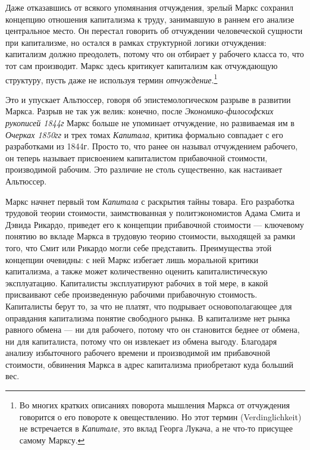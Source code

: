 \documentclass[12pt]{book}
\begin{document}
Даже отказавшись от всякого упомянания отчуждения, зрелый Маркс сохранил концепцию отношения капитализма к труду, занимавшую в раннем его анализе центральное место. Он перестал говорить об отчуждении человеческой сущности при капитализме, но остался в рамках структурной логики отчуждения: капитализм должно преодолеть, потому что он отбирает у рабочего класса то, что тот сам производит. Маркс здесь критикует капитализм как отчуждающую структуру, пусть даже не используя термин \textit{отчуждение}.\footnote{Во многих кратких описаниях поворота мышления Маркса от отчуждения говорится о его повороте к овеществлению. Но этот термин (Verdinglichkeit) не встречается в \textit{Капитале}, это вклад Георга Лукача, а не что-то присущее самому Марксу.}

Это и упускает Альтюссер, говоря об эпистемологическом разрыве в развитии Маркса. Разрыв не так уж велик: конечно, после \textit{Экономико-философских рукописей 1844г} Маркс больше не упоминает отчуждение, но развиваемая им в \textit{Очерках 1850гг} и трех томах \textit{Капитала}, критика формально совпадает с его разработками из 1844г. Просто то, что ранее он называл отчуждением рабочего, он теперь называет присвоением капиталистом прибавочной стоимости, производимой рабочим. Это различие не столь существенно, как настаивает Альтюссер.

Маркс начнет первый том \textit{Капитала} с раскрытия тайны товара. Его разработка трудовой теории стоимости, заимствованная у политэкономистов Адама Смита и Дэвида Рикардо, приведет его к концепции прибавочной стоимости --- ключевому понятию во вкладе Маркса в трудовую теорию стоимости, выходящей за рамки того, что Смит или Рикардо могли себе представить. Преимущества этой концепции очевидны: с ней Маркс избегает лишь моральной критики капитализма, а также может количественно оценить капиталистическую эксплуатацию. Капиталисты эксплуатируют рабочих в той мере, в какой присваивают себе произведенную рабочими прибавочную стоимость. Капиталисты берут то, за что не платят, что подрывает основополагающее для оправдания капитализма понятие свободного рынка. В капитализме нет рынка равного обмена --- ни для рабочего, потому что он становится беднее от обмена, ни для капиталиста, потому что он извлекает из обмена выгоду. Благодаря анализу избыточного рабочего времени и производимой им прибавочной стоимости, обвинения Маркса в адрес капитализма приобретают куда больший вес.
\end{document}
